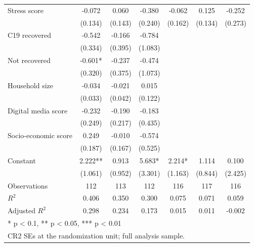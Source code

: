 \begin{table}
\begin{tabular}[t]{lcccccc}
Stress score & -0.072 & 0.060 & -0.380 & -0.062 & 0.125 & -0.252\\
 & (0.134) & (0.143) & (0.240) & (0.162) & (0.134) & (0.273)\\
C19 recovered & -0.542 & -0.166 & -0.784 &  &  & \\
 & (0.334) & (0.395) & (1.083) &  &  & \\
Not recovered & -0.601* & -0.237 & -0.474 &  &  & \\
 & (0.320) & (0.375) & (1.073) &  &  & \\
Household size & -0.034 & -0.021 & 0.015 &  &  & \\
 & (0.033) & (0.042) & (0.122) &  &  & \\
Digital media score & -0.232 & -0.190 & -0.183 &  &  & \\
 & (0.249) & (0.217) & (0.435) &  &  & \\
Socio-economic score & 0.249 & -0.010 & -0.574 &  &  & \\
 & (0.187) & (0.167) & (0.525) &  &  & \\
Constant & 2.222** & 0.913 & 5.683* & 2.214* & 1.114 & 0.100\\
 & (1.061) & (0.952) & (3.301) & (1.163) & (0.844) & (2.425)\\
Observations & 112 & 113 & 112 & 116 & 117 & 116\\
$R^{2}$ & 0.406 & 0.350 & 0.300 & 0.075 & 0.071 & 0.059\\
Adjusted $R^{2}$ & 0.298 & 0.234 & 0.173 & 0.015 & 0.011 & -0.002\\
\bottomrule
\multicolumn{7}{l}{\rule{0pt}{1em}* p < 0.1, ** p < 0.05, *** p < 0.01}\\
\multicolumn{7}{l}{\rule{0pt}{1em}CR2 SEs at the randomization unit; full analysis sample.}\\
\end{tabular}
\end{table}
